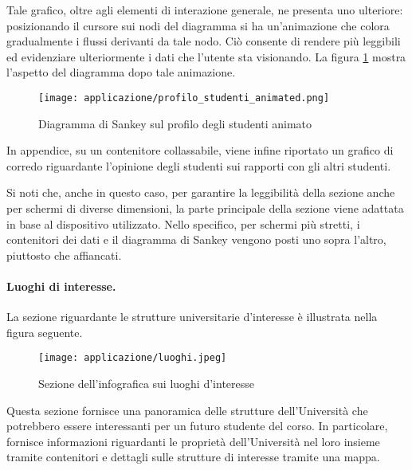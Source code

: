 Tale grafico, oltre agli elementi di interazione generale, ne presenta uno ulteriore: posizionando il cursore sui nodi del diagramma si ha un'animazione 
che colora gradualmente i flussi derivanti da tale nodo. Ciò consente di rendere più leggibili ed evidenziare ulteriormente i dati che l'utente sta visionando.
La figura \ref{fig:app_profilo_stud_animated} mostra l'aspetto del diagramma dopo tale animazione.
\begin{figure}[H] 
    \centering 
    \texttt{[image: applicazione/profilo\_studenti\_animated.png]} 
    \caption{Diagramma di Sankey sul profilo degli studenti animato}
    \label{fig:app_profilo_stud_animated}
\end{figure}

In appendice, su un contenitore collassabile, viene infine riportato un grafico di corredo riguardante l'opinione degli studenti sui rapporti con gli altri studenti.

\bigskip
\noindent Si noti che, anche in questo caso, per garantire la leggibilità della sezione anche per schermi di diverse dimensioni, la parte principale della sezione viene adattata 
in base al dispositivo utilizzato. Nello specifico, per schermi più stretti, i contenitori dei dati e il diagramma di Sankey vengono posti uno sopra l'altro, piuttosto che affiancati.

\paragraph{Luoghi di interesse.} La sezione riguardante le strutture universitarie d'interesse è illustrata nella figura seguente. 
\begin{figure}[H] 
    \centering 
    \texttt{[image: applicazione/luoghi.jpeg]} 
    \caption{Sezione dell'infografica sui luoghi d'interesse}
    \label{fig:app_luoghi}
\end{figure}
\noindent Questa sezione fornisce una panoramica delle strutture dell'Università che potrebbero essere interessanti per un futuro studente del corso.
In particolare, fornisce informazioni riguardanti le proprietà dell'Università nel loro insieme tramite contenitori e dettagli sulle strutture di interesse 
tramite una mappa. 

